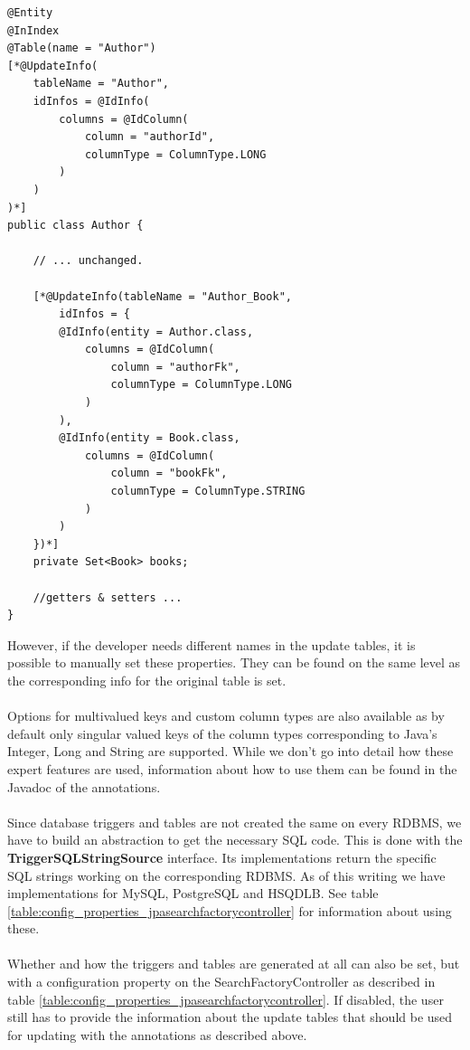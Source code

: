 \lstset{language=java}
\begin{lstlisting}[frame=htrbl, caption={Author.java with Hibernate Search annotations}, label={lst:author.java_3}]
@Entity
@InIndex
@Table(name = "Author")
[*@UpdateInfo(
	tableName = "Author", 
	idInfos = @IdInfo(
		columns = @IdColumn(
			column = "authorId", 
			columnType = ColumnType.LONG
		)
	)
)*]
public class Author {
	
	// ... unchanged.
	
	[*@UpdateInfo(tableName = "Author_Book", 
		idInfos = {
		@IdInfo(entity = Author.class, 
			columns = @IdColumn(
				column = "authorFk",
				columnType = ColumnType.LONG
			)
		),
		@IdInfo(entity = Book.class,
			columns = @IdColumn(
				column = "bookFk",
				columnType = ColumnType.STRING
			)
		)
	})*]
	private Set<Book> books;
	
	//getters & setters ...
}
\end{lstlisting}
\noindent
However, if the developer needs different names in the update tables, it is possible to manually set these properties. They can be found on the same level as the corresponding info for the original table is set.
\\\\
Options for multivalued keys and custom column types are also available as by default only singular valued keys of the column types corresponding to Java's Integer, Long and String are supported. While we don't go into detail how these expert features are used, information about how to use them can be found in the Javadoc of the annotations.
\\\\
Since database triggers and tables are not created the same on every RDBMS, we have to build an abstraction to get the necessary SQL code. This is done with the \textbf{TriggerSQLStringSource} interface. Its implementations return the specific SQL strings working on the corresponding RDBMS. As of this writing we have implementations for MySQL, PostgreSQL and HSQDLB. See table \ref{table:config_properties_jpasearchfactorycontroller} for information about using these.
\\\\
Whether and how the triggers and tables are generated at all can also be set, but with a configuration property on the SearchFactoryController as described in table  \ref{table:config_properties_jpasearchfactorycontroller}. If disabled, the user still has to provide the information about the update tables that should be used for updating with the annotations as described above.


